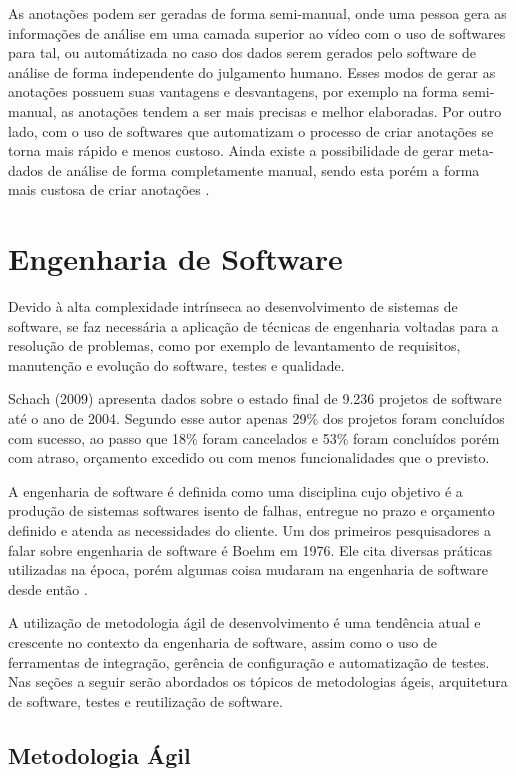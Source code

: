 As anotações podem ser geradas de forma semi-manual, onde uma pessoa gera as informações de análise em uma camada superior ao vídeo com o uso de softwares para tal, ou automátizada no caso dos dados serem gerados pelo software de análise de forma independente do julgamento humano. Esses modos de gerar as anotações possuem suas vantagens e desvantagens, por exemplo na forma semi-manual, as anotações tendem a ser mais precisas e melhor elaboradas. Por outro lado, com o uso de softwares que automatizam o processo de criar anotações se torna mais rápido e menos custoso. Ainda existe a possibilidade de gerar meta-dados de análise de forma completamente manual, sendo esta porém a forma mais custosa de criar anotações \cite{sadallah2012}.

\section{Engenharia de Software}

Devido à alta complexidade intrínseca ao desenvolvimento de sistemas de software, se faz necessária a aplicação de técnicas de engenharia voltadas para a resolução de problemas, como por exemplo de levantamento de requisitos, manutenção e evolução do software, testes e qualidade. 

Schach (2009) apresenta dados sobre o estado final de 9.236 projetos de software até o ano de 2004. Segundo esse autor apenas 29\% dos projetos foram concluídos com sucesso, ao passo que 18\% foram cancelados e 53\% foram concluídos porém com atraso, orçamento excedido ou com menos funcionalidades que o previsto.

A engenharia de software é definida como uma disciplina cujo objetivo é a produção de sistemas softwares isento de falhas, entregue no prazo e orçamento definido e atenda as necessidades do cliente. Um dos primeiros pesquisadores a falar sobre engenharia de software é  Boehm em 1976. Ele cita diversas práticas utilizadas na época, porém algumas coisa mudaram na engenharia de software desde então \cite{schach2009, boehm1976}.

A utilização de metodologia ágil de desenvolvimento é uma tendência atual e crescente no contexto da engenharia de software, assim como o uso de ferramentas de integração, gerência de configuração e automatização de testes. Nas seções a seguir serão abordados os tópicos de metodologias ágeis, arquitetura de software, testes e reutilização de software.

\subsection{Metodologia Ágil}

